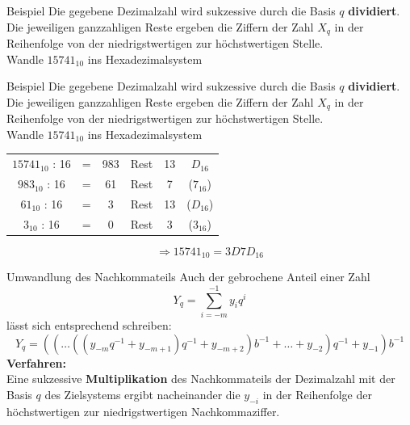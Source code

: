 \documentclass[12pt%
,aspectratio=169%
]{beamer}
\begin{document}
\begin{frame}{Beispiel}
Die gegebene Dezimalzahl wird sukzessive durch die Basis $q$ \textbf{dividiert}.\\
Die jeweiligen ganzzahligen Reste ergeben die Ziffern der Zahl $X_q$ in der Reihenfolge von der niedrigstwertigen zur höchstwertigen Stelle.\\
Wandle $15741_{10}$ ins Hexadezimalsystem
\end{frame}

\begin{frame}{Beispiel}
Die gegebene Dezimalzahl wird sukzessive durch die Basis $q$ \textbf{dividiert}.\\
Die jeweiligen ganzzahligen Reste ergeben die Ziffern der Zahl $X_q$ in der Reihenfolge von der niedrigstwertigen zur höchstwertigen Stelle.\\
Wandle $15741_{10}$ ins Hexadezimalsystem
\begin{table}[h]
\begin{tabular}{cccccc}
$15741_{10}$ : 16 & = & 983 & Rest & 13 & $D_{16}$ \\ 
$983_{10}$ : 16 & = & 61 & Rest & 7 & ($7_{16}$) \\
$61_{10}$ : 16 & = &  3 & Rest & 13 & ($D_{16}$) \\
$3_{10}$ : 16 & = & 0 & Rest & 3 & ($3_{16}$)
\end{tabular}
\end{table}
\begin{center}
	$$ \Rightarrow 15741_{10} = 3D7D_{16}$$
\end{center}
\end{frame}

\begin{frame}{Umwandlung des Nachkommateils}
Auch der gebrochene Anteil einer Zahl $$Y_q = \sum_{i=-m}^{-1} y_i q^i$$ lässt sich entsprechend schreiben:
$$
	Y_q = ((\ldots ((y_{-m} q^{-1} + y_{-m+1}) q^{-1} + y_{-m+2}) b^{-1} + \ldots +y_{-2}) q^{-1} + y_{-1}) b^{-1}
$$
\textbf{Verfahren:}\\
Eine sukzessive \textbf{Multiplikation} des Nachkommateils der Dezimalzahl mit der Basis $q$ des Zielsystems ergibt nacheinander die $y_{-i}$ in der Reihenfolge der höchstwertigen zur niedrigstwertigen Nachkommaziffer.
\end{frame}
\end{document}
